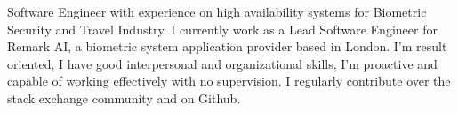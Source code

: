 

\begin{cvparagraph}

Software Engineer with experience on high availability systems for Biometric Security and Travel Industry.
I currently work as a Lead Software Engineer for Remark AI, a biometric system application provider based in London.
I’m result oriented, I have good interpersonal and organizational skills, I'm proactive and capable of working effectively with
no supervision.
I regularly contribute over the stack exchange community and on Github.
\end{cvparagraph}
